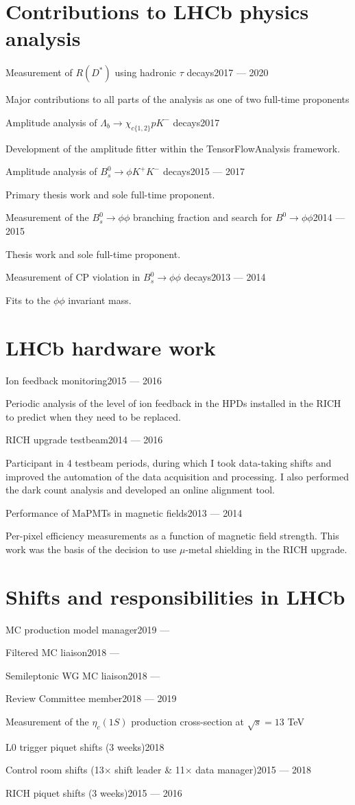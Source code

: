 \documentclass[contbibnum,titleabove]{simplecv}
\newcommand\dateditem[2]{\vspace{0.5em}#1\hfill#2\par}
\newcommand\topictitle[3]{\par\dateditem{#1}{#3}{\color{darkgray}#2}}
\begin{document}
	\section{Contributions to LHCb physics analysis}
	\topictitle{Measurement of $R(D^*)$ using hadronic $\tau$ decays}{Major contributions to all parts of the analysis as one of two full-time proponents}{2017 --- 2020}
	\topictitle{Amplitude analysis of $\Lambda_b \to \chi_{c\{1,2\}} p K^{-}$ decays}{Development of the amplitude fitter within the TensorFlowAnalysis framework.}{2017}
	\topictitle{Amplitude analysis of $B^0_s \to \phi K^{+}K^{-}$ decays}{Primary thesis work and sole full-time proponent.}{2015 --- 2017}
	\topictitle{Measurement of the $B^0_s \to \phi\phi$ branching fraction and search for $B^0 \to \phi \phi$}{Thesis work and sole full-time proponent.}{2014 --- 2015}
	\topictitle{Measurement of CP violation in $B^0_s \to \phi\phi$ decays}{Fits to the $\phi\phi$ invariant mass.}{2013 --- 2014}
	\section{LHCb hardware work}
	\topictitle{Ion feedback monitoring}{
	Periodic analysis of the level of ion feedback in the HPDs installed in the RICH to predict when they need to be replaced.
	}{2015 --- 2016}
	\topictitle{RICH upgrade testbeam}{
	Participant in 4 testbeam periods, during which I took data-taking shifts and improved the automation of the data acquisition and processing. I also performed the dark count analysis and developed an online alignment tool.
	}{2014 --- 2016}
	\topictitle{Performance of MaPMTs in magnetic fields}{
	Per-pixel efficiency measurements as a function of magnetic field strength. This work was the basis of the decision to use $\mu$-metal shielding in the RICH upgrade.
	}{2013 --- 2014}
	\section{Shifts and responsibilities in LHCb}
	\topictitle{MC production model manager}{}{2019 --- \phantom{2020}}
	\topictitle{Filtered MC liaison}{}{2018 --- \phantom{2020}}
	\topictitle{Semileptonic WG MC liaison}{}{2018 --- \phantom{2020}}
	\topictitle{Review Committee member}{Measurement of the $\eta_c(1S)$ production cross-section at $\sqrt{s}=13$ TeV}{2018 --- 2019}
	\topictitle{L0 trigger piquet shifts (3 weeks)}{}{2018}
	\topictitle{Control room shifts (13$\times$ shift leader \& 11$\times$ data manager)}{}{2015 --- 2018}
	\topictitle{RICH piquet shifts (3 weeks)}{}{2015 --- 2016}
\end{document}
